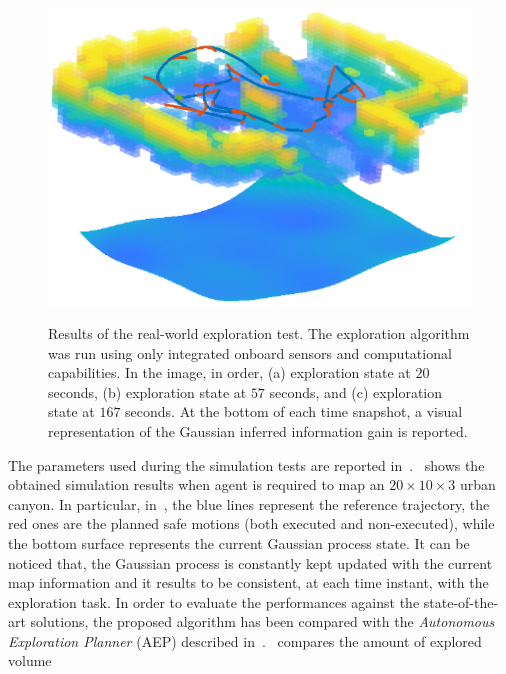 \begin{figure}[!t]
\begin{center}
\begin{minipage}{.4\linewidth}
{				\includegraphics[trim={5cm 1.5cm 3cm 2.2cm}, clip = true, width = 1\textwidth]{Figs/Chapter4/167s.eps}}
		\end{minipage}
	\end{center}
	\caption{Results of the real-world exploration test. The exploration algorithm was run using only integrated onboard
	sensors and computational capabilities. In the image, in order, (a) exploration state at $20$ seconds,
	(b) exploration state at $57$ seconds, and (c) exploration state at $167$ seconds.
	At the bottom of each time snapshot, a visual representation of the Gaussian inferred information gain is reported.
	}\label{FIG:EXPLORATION-REAL-TEST}
\end{figure}
The parameters used during the simulation tests are reported in~.~
shows the obtained simulation results when agent is required to map an $20\times10\times3$
urban canyon. In particular, in~, the blue lines represent the reference trajectory, the red
ones are the planned safe motions (both executed and non-executed), while the bottom surface represents the current Gaussian
process state. It can be noticed that, the Gaussian process is constantly kept updated with the current map information and it
results to be consistent, at each time instant, with the exploration task. In order to evaluate the performances against the
state-of-the-art solutions, the proposed algorithm has been compared with the \emph{Autonomous Exploration Planner} (AEP)
described in~\cite{selin2019efficient}.~ compares the amount of explored volume
